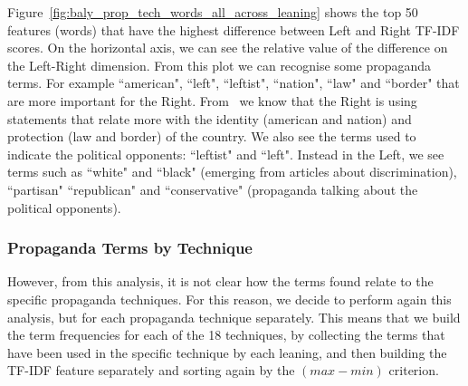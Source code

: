 Figure~\ref{fig:baly_prop_tech_words_all_across_leaning} shows the top 50 features (words) that have the highest difference between Left and Right TF-IDF scores.
On the horizontal axis, we can see the relative value of the difference on the Left-Right dimension.
From this plot we can recognise some propaganda terms.
For example ``american", ``left", ``leftist", ``nation", ``law" and ``border" that are more important for the Right. From~\citet{seargeant2020art} we know that the Right is using statements
that relate more with the identity  (american and nation) and protection  (law and border) of the country.
We also see the terms used to indicate the political opponents: ``leftist" and ``left".
Instead in the Left, we see terms such as ``white" and ``black" (emerging from articles about discrimination), ``partisan" ``republican" and ``conservative" (propaganda talking about the political opponents).

\subsubsection{Propaganda Terms by Technique}
However, from this analysis, it is not clear how the terms found relate to the specific propaganda techniques. For this reason, we decide to perform again this analysis, but for each propaganda technique separately.
This means that we build the term frequencies for each of the 18 techniques, by collecting the terms that have been used in the specific technique by each leaning, and then building the TF-IDF feature separately and sorting again by the $(max - min)$ criterion.


